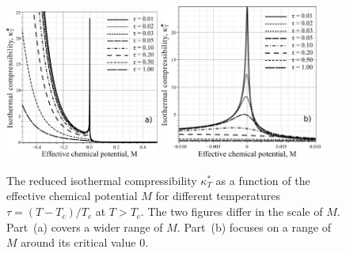 \begin{figure}[h!] 
	\includegraphics[width=0.45\textwidth]{f2b.pdf}
	\includegraphics[width=0.475\textwidth]{f2c.pdf}
	\vskip-3mm
	\caption{The reduced isothermal compressibility $\kappa^*_T$ as a function of the effective chemical potential $M$ for different temperatures $\tau = (T - T_c)/T_c$ at $T > T_c$. The two figures differ in the scale of $M$. Part~(a) covers a wider range of $M$. Part~(b) focuses on a range of $M$ around its critical value $0$.
	}
	\label{fig2b}
\end{figure}


